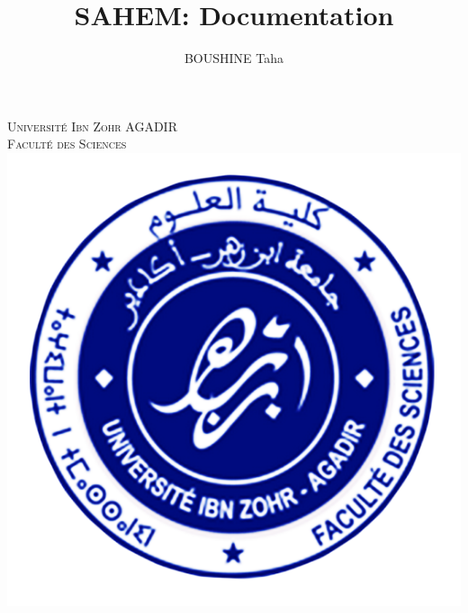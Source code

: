 \documentclass[11pt, openany]{report}
\begin{document}
\title{SAHEM: Documentation  }
\author{BOUSHINE Taha}
\date{}


\thispagestyle{empty}
\renewcommand{\chaptermark}[1]{\markboth{\chaptername\ \thechapter. #1}{}}
\renewcommand{\sectionmark}[1]{\markright{\thesection. #1}}


\makeatletter
\def\figurename{{\protect\sc \protect\small\bfseries Fig.}}
\let\captionORI\caption
\def\caption#1{\captionORI{\rm\small #1}}
\makeatother


\begin{titlepage}
  \begin{sffamily}
    \begin{center}

      \textsc{\LARGE Université Ibn Zohr AGADIR\\
        Faculté des Sciences\\[1cm]
      }
      \includegraphics[scale=0.35]{assets/fsa.png}~\\[1cm]



\end{center}
\end{sffamily}
\end{titlepage}
\end{document}
